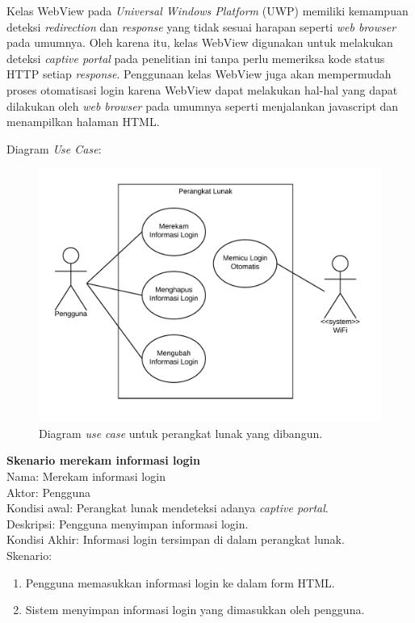\documentclass[a4paper,twoside]{article}
\begin{document}
\begin{enumerate}
\begin{itemize}
{                Kelas WebView pada \textit{Universal Windows Platform} (UWP) memiliki kemampuan deteksi \textit{redirection} dan \textit{response} yang tidak sesuai harapan seperti \textit{web browser} pada umumnya. Oleh karena itu, kelas WebView digunakan untuk melakukan deteksi \textit{captive portal} pada penelitian ini tanpa perlu memeriksa kode status HTTP setiap \textit{response}. Penggunaan kelas WebView juga akan mempermudah proses otomatisasi login karena WebView dapat melakukan hal-hal yang dapat dilakukan oleh \textit{web browser} pada umumnya seperti menjalankan javascript dan menampilkan halaman HTML.
            }
        \end{itemize}
        
        \pagebreak
        
        Diagram \textit{Use Case}:
        
        \begin{figure}[h]
            \centering
            \includegraphics[scale=0.77]{usecase.png}
            \caption[Diagram \textit{use case} untuk perangkat lunak yang dibangun.]{Diagram \textit{use case} untuk perangkat lunak yang dibangun.}
            \label{fig:usecase}
        \end{figure}

        \textbf{Skenario merekam informasi login}\\
        Nama: Merekam informasi login\\
        Aktor: Pengguna\\
        Kondisi awal: Perangkat lunak mendeteksi adanya \textit{captive portal}.\\
        Deskripsi: Pengguna menyimpan informasi login.\\
        Kondisi Akhir: Informasi login tersimpan di dalam perangkat lunak.\\
        Skenario:
        \begin{enumerate}
            \item{Pengguna memasukkan informasi login ke dalam form HTML.}
            \item{Sistem menyimpan informasi login yang dimasukkan oleh pengguna.}
        \end{enumerate}


\end{enumerate}
\end{document}
